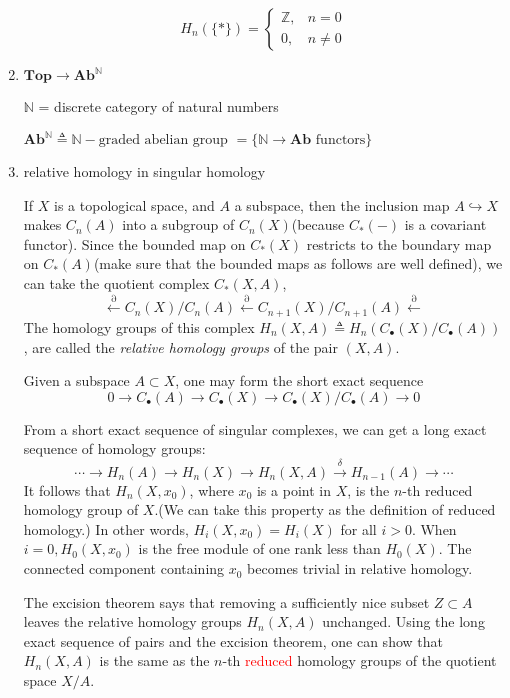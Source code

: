 \documentclass[UTF8]{ctexart}
\DeclareMathOperator{\homology}{H_\ast}
\newcommand{\Top}{\mathbf{Top}}
\newcommand{\Ab}{\mathbf{Ab}}
\begin{document}
\begin{enumerate}
\[
H_n(\{\ast\}) =
\begin{cases}
\mathbb{Z}, & n = 0\\
0, & n \neq 0
\end{cases}
\]

\item $\Top \overset{\homology}{\longrightarrow} \Ab^{\mathbb{N}}$

$\mathbb{N}$ = discrete category of natural numbers

$\Ab^{\mathbb{N}} \triangleq \mathbb{N}\!\!-\!\!\text{graded abelian group } = \{\mathbb{N} \to \Ab \text{ functors}\}$

\item relative homology in singular homology\cite{relative_homology_wiki}\cite{relative_homology_planet}

If $X$ is a topological space, and $A$ a subspace, then the inclusion map $A\hookrightarrow X$ makes $C_n(A)$ into a subgroup of $C_n(X)$(because $C_{\ast}(-)$ is a covariant functor). Since the bounded map on $C_{\ast}(X)$ restricts to the boundary map on $C_{\ast}(A)$(make sure that the bounded maps as follows are well defined), we can take the quotient complex $C_{\ast}(X,A)$,
\[
\overset{\partial}{\leftarrow} C_n(X)/C_n(A) \overset{\partial}{\leftarrow} C_{n+1}(X)/C_{n+1}(A) \overset{\partial}{\leftarrow}
\]
The homology groups of this complex $H_n⁢(X,A) \triangleq H_n(C_{\bullet}(X)/C_{\bullet}(A))$, are called the \textit{relative homology groups} of the pair $(X,A)$.

Given a subspace $A\subset X$, one may form the short exact sequence
\[
0\to C_{\bullet}(A)\to C_{\bullet}(X)\to C_{\bullet}(X)/C_{\bullet}(A) \to 0
\]

From a short exact sequence of singular complexes, we can get a long exact sequence of homology groups:
\[
\cdots \to H_n(A) \to H_n(X) \to H_n(X,A) \overset{\delta}{\to} H_{n-1}(A) \to \cdots
\]
It follows that $H_n(X, x_0)$, where $x_0$ is a point in $X$, is the $n$-th reduced homology group of $X$.(We can take this property as the definition of reduced homology.) In other words, $H_i(X, x_0) = H_i(X)$ for all $i > 0$. When $i = 0, H_0(X, x_0)$ is the free module of one rank less than $H_0(X)$. The connected component containing $x_0$ becomes trivial in relative homology.

The excision theorem says that removing a sufficiently nice subset $Z\subset A$ leaves the relative homology groups $H_n(X, A)$ unchanged. Using the long exact sequence of pairs and the excision theorem, one can show that $H_n(X, A)$ is the same as the $n$-th \textcolor{red}{reduced} homology groups of the quotient space $X/A$.\cite[p.50]{vick2012homology}


\end{enumerate}
\end{document}
